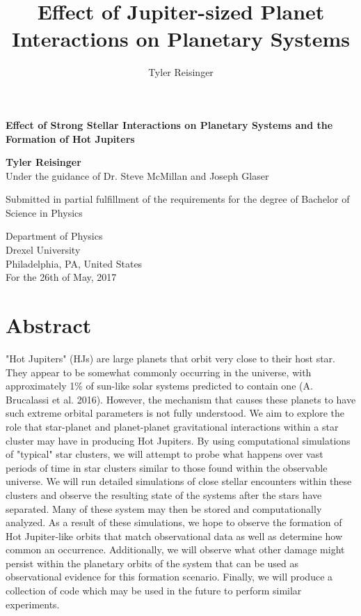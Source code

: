 \documentclass[12pt]{article}
\author{Tyler Reisinger}
\title{Effect of Jupiter-sized Planet Interactions on Planetary Systems}
\date{}
\begin{document}
\begin{titlepage}
    \begin{center}
        \vspace*{1cm}
        
        \textbf{Effect of Strong Stellar Interactions on Planetary Systems and
            the Formation of Hot Jupiters}
        
        \vspace{1.5cm}
        
        \textbf{Tyler Reisinger}\\
        Under the guidance of Dr. Steve McMillan and Joseph Glaser
        
        \vfill
        
        Submitted in partial fulfillment of the requirements for the
        degree of Bachelor of Science in Physics
        
        \vspace{0.8cm}

        Department of Physics \\
        Drexel University \\
        Philadelphia, PA, United States\\
        For the 26th of May, 2017 
    \end{center}
\end{titlepage}

\tableofcontents

\clearpage

\section{Abstract}

"Hot Jupiters" (HJs) are large planets that orbit very close to their host star. 
They appear to be somewhat commonly occurring in the universe, with approximately 1\% 
of sun-like solar systems predicted to contain one (A. Brucalassi et al. 2016). 
However, the mechanism that causes these planets to have such extreme orbital parameters
is not fully understood. 
We aim to explore the role that star-planet and planet-planet gravitational interactions 
within a star cluster may have in producing Hot 
Jupiters. By using computational simulations of "typical" star clusters,
we will attempt to probe what happens over vast periods of time
in star clusters similar to those found within the observable universe.
We will run detailed simulations of close stellar encounters within these clusters
and observe the resulting state of the systems after the stars have separated. Many
of these system may then be stored and computationally analyzed. 
As a result of these simulations, 
we hope to observe the formation of Hot Jupiter-like orbits that
match observational data as well as determine how common an occurrence.
Additionally, we will observe what other damage might 
persist within the planetary orbits of the system that can be used as 
observational evidence for this formation scenario. Finally, we will
produce a collection of code which may be used in the future to perform similar
experiments.
\end{document}
